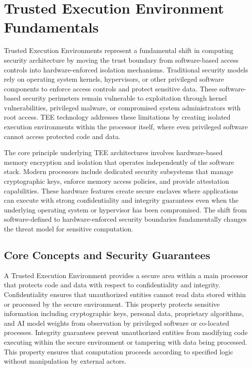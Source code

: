 \section{Trusted Execution Environment Fundamentals}

Trusted Execution Environments represent a fundamental shift in computing security architecture by moving the trust boundary from software-based access controls into hardware-enforced isolation mechanisms. Traditional security models rely on operating system kernels, hypervisors, or other privileged software components to enforce access controls and protect sensitive data. These software-based security perimeters remain vulnerable to exploitation through kernel vulnerabilities, privileged malware, or compromised system administrators with root access. TEE technology addresses these limitations by creating isolated execution environments within the processor itself, where even privileged software cannot access protected code and data.

The core principle underlying TEE architectures involves hardware-based memory encryption and isolation that operates independently of the software stack. Modern processors include dedicated security subsystems that manage cryptographic keys, enforce memory access policies, and provide attestation capabilities. These hardware features create secure enclaves where applications can execute with strong confidentiality and integrity guarantees even when the underlying operating system or hypervisor has been compromised. The shift from software-defined to hardware-enforced security boundaries fundamentally changes the threat model for sensitive computation.

\subsection{Core Concepts and Security Guarantees}

A Trusted Execution Environment provides a secure area within a main processor that protects code and data with respect to confidentiality and integrity. Confidentiality ensures that unauthorized entities cannot read data stored within or processed by the secure environment. This property protects sensitive information including cryptographic keys, personal data, proprietary algorithms, and AI model weights from observation by privileged software or co-located processes. Integrity guarantees prevent unauthorized entities from modifying code executing within the secure environment or tampering with data being processed. This property ensures that computation proceeds according to specified logic without manipulation by external actors.

